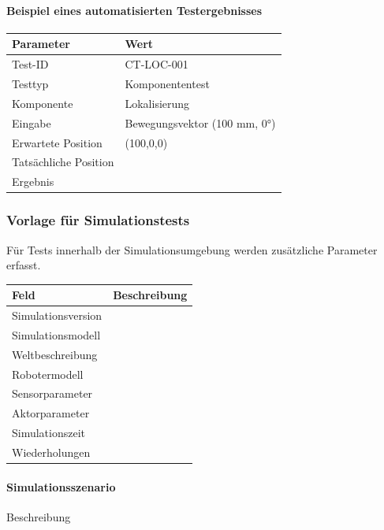 \paragraph{Beispiel eines automatisierten
Testergebnisses}\label{beispiel-eines-automatisierten-testergebnisses}

\begin{longtable}[]{@{}ll@{}}
\toprule\noalign{}
Parameter & Wert \\
\midrule\noalign{}
\endhead
\bottomrule\noalign{}
\endlastfoot
Test-ID & CT-LOC-001 \\
Testtyp & Komponententest \\
Komponente & Lokalisierung \\
Eingabe & Bewegungsvektor (100 mm, 0°) \\
Erwartete Position & (100,0,0) \\
Tatsächliche Position & \\
Ergebnis & \\
\end{longtable}

\subsubsection{Vorlage für
Simulationstests}\label{vorlage-fuxfcr-simulationstests}

Für Tests innerhalb der Simulationsumgebung werden zusätzliche Parameter
erfasst.

\begin{longtable}[]{@{}ll@{}}
\toprule\noalign{}
Feld & Beschreibung \\
\midrule\noalign{}
\endhead
\bottomrule\noalign{}
\endlastfoot
Simulationsversion & \\
Simulationsmodell & \\
Weltbeschreibung & \\
Robotermodell & \\
Sensorparameter & \\
Aktorparameter & \\
Simulationszeit & \\
Wiederholungen & \\
\end{longtable}

\paragraph{Simulationsszenario}\label{simulationsszenario}

Beschreibung

